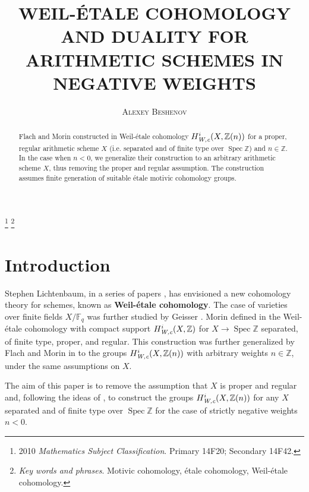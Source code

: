 \documentclass[leqno,12pt]{article}
\title{\uppercase{Weil-\'{e}tale cohomology and duality for arithmetic schemes
    in negative weights}}
\author{\textsc{Alexey Beshenov}}
\date{}
\theoremstyle{plain}
\theoremstyle{definition}
\DeclareMathOperator{\Spec}{Spec}
\newcommand{\FF}{\mathbb{F}}
\newcommand{\ZZ}{\mathbb{Z}}
\newcommand{\Wc}{\text{\it W,c}}
\begin{document}
\maketitle

\footnote{ %
2010 \textit{Mathematics Subject Classification}.
Primary 14F20; Secondary 14F42.}
\footnote{ %
  \textit{Key words and phrases}.
  Motivic cohomology, \'{e}tale cohomology, Weil-\'{e}tale cohomology.}


\begin{abstract}
  Flach and Morin constructed in \cite{Flach-Morin-2018} Weil-\'{e}tale
  cohomology $H^i_\Wc (X, \ZZ(n))$ for a proper, regular arithmetic scheme $X$
  (i.e. separated and of finite type over $\Spec \ZZ$) and $n \in \ZZ$. In the
  case when $n < 0$, we generalize their construction to an arbitrary arithmetic
  scheme $X$, thus removing the proper and regular assumption.  The construction
  assumes finite generation of suitable \'{e}tale motivic cohomology groups.
\end{abstract}

\section{Introduction}
\label{sec:introduction}

Stephen Lichtenbaum, in a series of papers
\cite{Lichtenbaum-2005,Lichtenbaum-2009-Euler-char,Lichtenbaum-2009-number-rings},
has envisioned a new cohomology theory for schemes, known as
\textbf{Weil-\'{e}tale cohomology}. The case of varieties over finite fields
$X/\FF_q$ was further studied by Geisser
\cite{Geisser-2004,Geisser-2006,Geisser-2010-arithmetic-homology}. Morin defined
in \cite{Morin-2014} the Weil-\'{e}tale cohomology with compact support
$H^i_\Wc (X, \ZZ)$ for $X \to \Spec\ZZ$ separated, of finite type, proper, and
regular. This construction was further generalized by Flach and Morin in
\cite{Flach-Morin-2018} to the groups $H^i_\Wc (X, \ZZ(n))$ with arbitrary
weights $n \in \ZZ$, under the same assumptions on $X$.

The aim of this paper is to remove the assumption that $X$ is proper and regular
and, following the ideas of \cite{Flach-Morin-2018}, to construct the groups
$H^i_\Wc (X, \ZZ(n))$ for any $X$ separated and of finite type over $\Spec\ZZ$
for the case of strictly negative weights $n < 0$.
\end{document}
